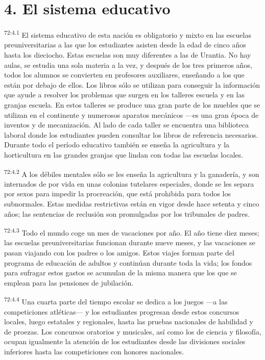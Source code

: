 \section*{4. El sistema educativo}
\par
\textsuperscript{72:4.1} El sistema educativo de esta nación es obligatorio y mixto en las escuelas preuniversitarias a las que los estudiantes asisten desde la edad de cinco años hasta los dieciocho. Estas escuelas son muy diferentes a las de Urantia. No hay aulas, se estudia una sola materia a la vez, y después de los tres primeros años, todos los alumnos se convierten en profesores auxiliares, enseñando a los que están por debajo de ellos. Los libros sólo se utilizan para conseguir la información que ayude a resolver los problemas que surgen en los talleres escuela y en las granjas escuela. En estos talleres se produce una gran parte de los muebles que se utilizan en el continente y numerosos aparatos mecánicos ---es una gran época de inventos y de mecanización. Al lado de cada taller se encuentra una biblioteca laboral donde los estudiantes pueden consultar los libros de referencia necesarios. Durante todo el período educativo también se enseña la agricultura y la horticultura en las grandes granjas que lindan con todas las escuelas locales.

\par
\textsuperscript{72:4.2} A los débiles mentales sólo se les enseña la agricultura y la ganadería, y son internados de por vida en unas colonias tutelares especiales, donde se les separa por sexos para impedir la procreación, que está prohibida para todos los subnormales. Estas medidas restrictivas están en vigor desde hace setenta y cinco años; las sentencias de reclusión son promulgadas por los tribunales de padres.

\par
\textsuperscript{72:4.3} Todo el mundo coge un mes de vacaciones por año. El año tiene diez meses; las escuelas preuniversitarias funcionan durante nueve meses, y las vacaciones se pasan viajando con los padres o los amigos. Estos viajes forman parte del programa de educación de adultos y continúan durante toda la vida; los fondos para sufragar estos gastos se acumulan de la misma manera que los que se emplean para las pensiones de jubilación.

\par
\textsuperscript{72:4.4} Una cuarta parte del tiempo escolar se dedica a los juegos ---a las competiciones atléticas--- y los estudiantes progresan desde estos concursos locales, luego estatales y regionales, hasta las pruebas nacionales de habilidad y de proezas. Los concursos oratorios y musicales, así como los de ciencia y filosofía, ocupan igualmente la atención de los estudiantes desde las divisiones sociales inferiores hasta las competiciones con honores nacionales.

